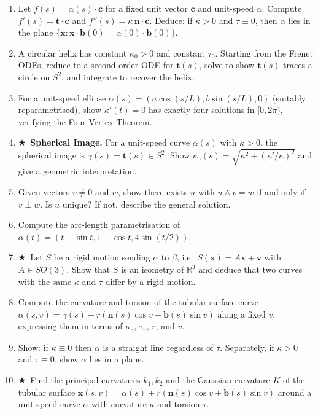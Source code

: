 \documentclass[11pt, a4paper]{article}
\newcommand{\R}{\mathbb{R}}
\newcommand{\mbf}[1]{\mathbf{#1}}
\newcommand{\kp}{\kappa}
\newcommand{\tp}{\tau}
\newcommand{\hard}{$\bigstar$\ }
\begin{document}
\begin{enumerate}[label=\textbf{Q\arabic*.}, leftmargin=*, itemsep=6pt]
\item Let $f(s)=\alpha(s)\cdot\mbf{c}$ for a fixed unit vector $\mbf{c}$ and unit-speed $\alpha$. Compute $f'(s)=\mbf{t}\cdot\mbf{c}$ and $f''(s)=\kp\,\mbf{n}\cdot\mbf{c}$. Deduce: if $\kp>0$ and $\tp\equiv 0$, then $\alpha$ lies in the plane $\{\mathbf{x}:\mathbf{x}\cdot\mbf{b}(0)=\alpha(0)\cdot\mbf{b}(0)\}$.

\item A circular helix has constant $\kp_0>0$ and constant $\tp_0$. Starting from the Frenet ODEs, reduce to a second-order ODE for $\mbf{t}(s)$, solve to show $\mbf{t}(s)$ traces a circle on $S^2$, and integrate to recover the helix.

\item For a unit-speed ellipse $\alpha(s)=(a\cos(s/L), b\sin(s/L), 0)$ (suitably reparametrised), show $\kp'(t)=0$ has exactly four solutions in $[0,2\pi)$, verifying the Four-Vertex Theorem.

\item \hard \textbf{Spherical Image.} For a unit-speed curve $\alpha(s)$ with $\kp>0$, the spherical image is $\gamma(s)=\mbf{t}(s)\in S^2$. Show $\kp_\gamma(s)=\sqrt{\kp^2+(\kp'/\kp)^2}$ and give a geometric interpretation.

\item Given vectors $v\neq 0$ and $w$, show there exists $u$ with $u\wedge v=w$ if and only if $v\perp w$. Is $u$ unique? If not, describe the general solution.

\item Compute the arc-length parametrisation of $\alpha(t)=(t-\sin t, 1-\cos t, 4\sin(t/2))$.

\item \hard Let $S$ be a rigid motion sending $\alpha$ to $\beta$, i.e.\ $S(\mathbf{x})=A\mathbf{x}+\mathbf{v}$ with $A\in SO(3)$. Show that $S$ is an isometry of $\R^3$ and deduce that two curves with the same $\kp$ and $\tp$ differ by a rigid motion.

\item Compute the curvature and torsion of the tubular surface curve $\alpha(s,v)=\gamma(s)+r(\mbf{n}(s)\cos v+\mbf{b}(s)\sin v)$ along a fixed $v$, expressing them in terms of $\kp_\gamma$, $\tp_\gamma$, $r$, and $v$.

\item Show: if $\kp\equiv 0$ then $\alpha$ is a straight line regardless of $\tp$. Separately, if $\kp>0$ and $\tp\equiv 0$, show $\alpha$ lies in a plane.

\item \hard Find the principal curvatures $k_1,k_2$ and the Gaussian curvature $K$ of the tubular surface $\mathbf{x}(s,v)=\alpha(s)+r(\mbf{n}(s)\cos v+\mbf{b}(s)\sin v)$ around a unit-speed curve $\alpha$ with curvature $\kp$ and torsion $\tp$.


\end{enumerate}
\end{document}
